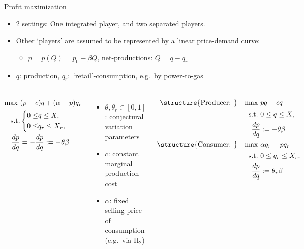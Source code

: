 \documentclass[aspectratio=169,t]{beamer}  %
\begin{document}
\begin{frame}{Profit maximization}
\begin{itemize}
\item 2 settings: One integrated player, and two separated players.
\item Other `players' are assumed to be represented by  a linear price-demand curve:
\begin{itemize}
\item $p = p(Q) = p_0 - \beta Q$, net-productions: $Q = q - q_r$ 
\end{itemize} 
 \item $q$: production, $q_r:$ `retail'-consumption, e.g.\ by power-to-gas
\end{itemize}

\begin{columns}
       \vspace*{-2ex}
       \begin{align*}
       \max\ & (p-c)q + (\alpha-p)q_r \notag \\
            \text{s.t.} & \left\{
                \begin{aligned}
                    0 \leq & q \leq X, \\
                    0 \leq & q_r \leq X_r,
                  \end{aligned}
            \right. \\
        \frac{dp}{dq} & = - \frac{dp}{dq} := - \theta\beta     
        \end{align*}
        \vspace{-3.8ex}
        \begin{itemize}
       \item  $\theta, \theta_r\in[0,1]$: conjectural variation parameters
       \item  $c$: constant marginal production cost
       \item $\alpha$: fixed selling price of consumption (e.g.\ via H$_2$)
       \end{itemize}
       \vspace*{-2ex}
    \begin{align*}
        \text{\structure{Producer: }}&& \max\ & p q_{} - c q_{}  \notag \\
        && \text{s.t.}\ & 
        \begin{aligned}
            & 0 \leq q \leq X,          
        \end{aligned} \\
       && \frac{dp}{dq} & := - \theta\beta \\
       \text{\structure{Consumer: }}&&  \max\ &  \alpha q_r - p q_r  \notag \\
           && \text{s.t.}\ & 
            \begin{aligned}
           & 0 \leq q_r \leq X_r.         
            \end{aligned} \\
         && \frac{dp}{dq} & := \theta_r\beta 
        \end{align*}
\end{columns}


\end{frame}
\end{document}
